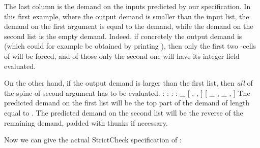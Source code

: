\documentclass[acmsmall,review]{acmart}\settopmatter{}
\begin{document}
The last column is the demand on the inputs predicted by our
specification.  In this first example, where the output demand is
smaller than the input list, the demand on the first argument 
is equal to the demand, while the demand on the second list  is
the empty demand. Indeed, if concretely the output demand is  (which could for example be obtained by printing ), then only the first
two -cells of  will be forced, and of those only the
second one will have its integer field evaluated.

On the other hand, if the output demand is larger than the first list,
then \textit{all} of the spine of second argument has to be evaluated.
%
\rotex{[1,2,3]}{[6,5,4]}{[1,2,3,4,5,6]}
      { :  :  :  : \_}{ [  ,  ,  ] } { [ \_ , \_ ,  ] }
%
The predicted demand on the first list will be the top part of the
demand of length equal to . The predicted demand on the
second list will be the reverse of the remaining demand, padded with
thunks if necessary.

Now we can give the actual StrictCheck specification
of :

\end{document}
